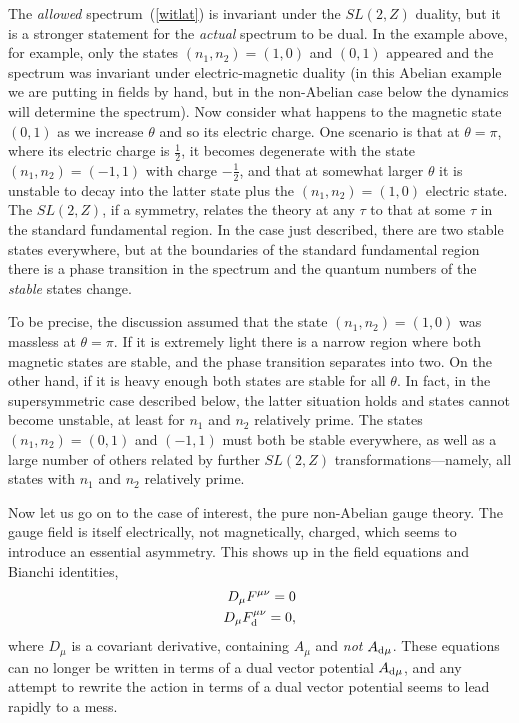 The {\it allowed} spectrum~(\ref{witlat}) is invariant under the
$SL(2,Z)$ duality, but it is a stronger statement for the {\it
actual} spectrum to be dual.  In the example above, for example,
only the states $(n_1, n_2) = (1,0)$ and $(0,1)$ appeared and the
spectrum was invariant under electric-magnetic duality (in this
Abelian example we are putting in fields by hand, but in the
non-Abelian case below the dynamics will determine the spectrum). 
Now consider what happens to the magnetic state $(0,1)$ as we
increase $\theta$ and so its electric charge.  One scenario is that
at $\theta = \pi$, where its electric charge is $\frac{1}{2}$, it
becomes degenerate with the state $(n_1, n_2) = (-1,1)$ with charge
$-\frac{1}{2}$, and that at somewhat larger $\theta$ it is unstable
to decay into the latter state plus the $(n_1, n_2) = (1,0)$ electric
state.  The $SL(2,Z)$, if a symmetry, relates the theory at any
$\tau$ to that at some $\tau$ in the standard fundamental region. In
the case just described, there are two stable states everywhere, but
at the boundaries of the standard fundamental region there is a phase
transition in the spectrum and the quantum numbers of the {\it
stable} states change.

To be precise, the discussion assumed
that the state $(n_1, n_2) = (1,0)$ was massless at $\theta = \pi$.
If it is extremely light there is a narrow region where both
magnetic states are stable, and the phase transition separates into
two.  On the other hand, if it is heavy enough both states are
stable for all $\theta$.
In fact, in the supersymmetric case described below, the latter
situation holds and states cannot become unstable, at least for
$n_1$ and $n_2$ relatively prime.  The states $(n_1, n_2) = (0,1)$
and $(-1,1)$ must both be stable everywhere, as well as a large
number of others related by further $SL(2,Z)$
transformations---namely, all states with $n_1$ and $n_2$ relatively
prime.

Now let us go on to the case of interest, the pure non-Abelian
gauge theory.  The gauge field is itself electrically, not
magnetically, charged, which seems to introduce an essential
asymmetry.  This shows up in the field equations and Bianchi
identities,
\begin{eqnarray}
D_\mu F^{\mu\nu} = 0 \nonumber\\
D_\mu F_{\rm d}^{\mu\nu} = 0,
\end{eqnarray}
where $D_\mu$ is a covariant derivative, containing $A_\mu$ and
{\it not} $A_{{\rm d} \mu}$.  These equations can no longer be
written in terms of a dual vector potential $A_{{\rm d} \mu}$, and any
attempt to rewrite the action in terms of a dual vector potential
seems to lead rapidly to a mess.

